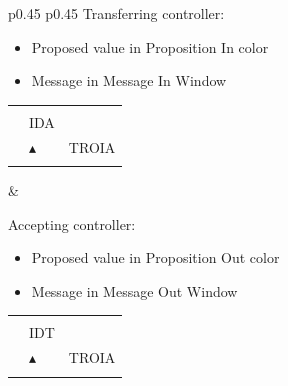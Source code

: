 \documentclass[a4paper,oneside,11pt]{memoir}
\newcommand{\colorref}[1]{\colorbox{Flight Highlight}{\color{#1}#1}}
\begin{document}
\begin{longtable}{p{} p{}}
  Transferring controller:

  \begin{itemize}
    \item Proposed value in \colorref{Proposition In} color
    \item Message in Message In Window
  \end{itemize}

  \begin{tabular}{
    >{\columncolor{Flight Highlight}}l 
    >{\columncolor{Flight Highlight}}l
    >{\columncolor{Flight Highlight}}l }
    {\color{Proposition In} H360} & {\color{Assumed} }       & {\color{Assumed} }      \\
    {\color{Assumed} ABC123} & {\color{Coordination} IDA}       & {\color{Assumed} }      \\
    {\color{Assumed} 100}    & {\color{Assumed} $\blacktriangle$} & {\color{Assumed} TROIA} \\
    {\color{Assumed} 180}    & {\color{Assumed} }          & {\color{Assumed} }     
  \end{tabular}

  &
 
  Accepting controller:

  \begin{itemize}
    \item Proposed value in \colorref{Proposition Out} color
    \item Message in Message Out Window
  \end{itemize}

  \begin{tabular}{
    >{\columncolor{Flight Highlight}}l 
    >{\columncolor{Flight Highlight}}l
    >{\columncolor{Flight Highlight}}l }
    {\color{Proposition Out} H360} & {\color{Coordination} }       & {\color{Coordination} }      \\
    {\color{Coordination} ABC123} & {\color{Coordination} IDT}       & {\color{Coordination} }      \\
    {\color{Coordination} 100}    & {\color{Coordination} $\blacktriangle$} & {\color{Coordination} TROIA} \\
    {\color{Coordination} 180}    & {\color{Coordination} }          & {\color{Coordination} }     
  \end{tabular}
\end{longtable}

\bigskip
\end{document}
